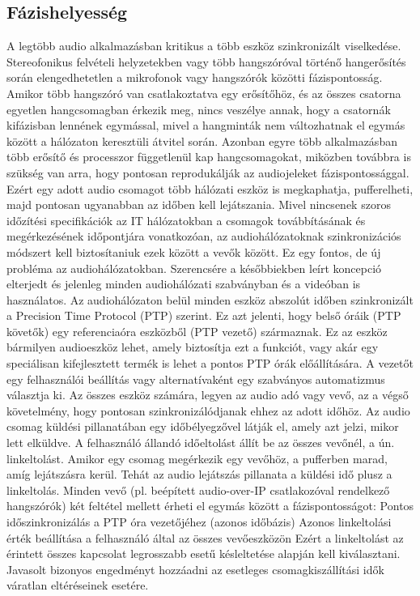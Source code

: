 \subsection{Fázishelyesség}
A legtöbb audio alkalmazásban kritikus a több eszköz szinkronizált viselkedése.
Stereofonikus felvételi helyzetekben vagy több hangszóróval történő hangerősítés
során elengedhetetlen a mikrofonok vagy hangszórók közötti fázispontosság.
Amikor több hangszóró van csatlakoztatva egy erősítőhöz, és az összes csatorna
egyetlen hangcsomagban érkezik meg, nincs veszélye annak, hogy a csatornák
kifázisban lennének egymással, mivel a hangminták nem változhatnak el egymás
között a hálózaton keresztüli átvitel során. Azonban egyre több alkalmazásban
több erősítő és processzor függetlenül kap hangcsomagokat, miközben továbbra is
szükség van arra, hogy pontosan reprodukálják az audiojeleket fázispontossággal.
Ezért egy adott audio csomagot több hálózati eszköz is megkaphatja, pufferelheti,
majd pontosan ugyanabban az időben kell lejátszania. Mivel nincsenek szoros
időzítési specifikációk az IT hálózatokban a csomagok továbbításának és
megérkezésének időpontjára vonatkozóan, az audiohálózatoknak szinkronizációs
módszert kell biztosítaniuk ezek között a vevők között. Ez egy fontos, de új
probléma az audiohálózatokban. Szerencsére a későbbiekben leírt koncepció
elterjedt és jelenleg minden audiohálózati szabványban és a videóban is
használatos. Az audiohálózaton belül minden eszköz abszolút időben szinkronizált
a Precision Time Protocol (PTP) szerint. Ez azt jelenti, hogy belső óráik (PTP
követők) egy referenciaóra eszközből (PTP vezető) származnak. Ez az eszköz
bármilyen audioeszköz lehet, amely biztosítja ezt a funkciót, vagy akár egy
speciálisan kifejlesztett termék is lehet a pontos PTP órák előállítására. A
vezetőt egy felhasználói beállítás vagy alternatívaként egy szabványos
automatizmus választja ki. Az összes eszköz számára, legyen az audio adó vagy
vevő, az a végső követelmény, hogy pontosan szinkronizálódjanak ehhez az adott
időhöz. Az audio csomag küldési pillanatában egy időbélyegzővel látják el, amely
azt jelzi, mikor lett elküldve. A felhasználó állandó időeltolást állít be az
összes vevőnél, a ún. linkeltolást. Amikor egy csomag megérkezik egy vevőhöz, a
pufferben marad, amíg lejátszásra kerül. Tehát az audio lejátszás pillanata a
küldési idő plusz a linkeltolás. Minden vevő (pl. beépített audio-over-IP
csatlakozóval rendelkező hangszórók) két feltétel mellett érheti el egymás
között a fázispontosságot: Pontos időszinkronizálás a PTP óra vezetőjéhez
(azonos időbázis) Azonos linkeltolási érték beállítása a felhasználó által az
összes vevőeszközön Ezért a linkeltolást az érintett összes kapcsolat
legrosszabb esetű késleltetése alapján kell kiválasztani. Javasolt bizonyos
engedményt hozzáadni az esetleges csomagkiszállítási idők váratlan eltéréseinek
esetére.
